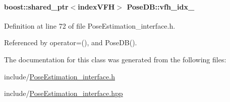\hypertarget{classPoseDB_a166e65f9bf6e0e268ae8e082e43fc242}{
\paragraph[{vfh\-\_\-idx\-\_\-}]{\setlength{\rightskip}{0pt plus 5cm}boost\-::shared\-\_\-ptr$<${\bf index\-V\-F\-H}$>$ Pose\-D\-B\-::vfh\-\_\-idx\-\_\-\hspace{0.3cm}{\ttfamily [private]}}}\label{classPoseDB_a166e65f9bf6e0e268ae8e082e43fc242}


Definition at line 72 of file Pose\-Estimation\-\_\-interface.\-h.



Referenced by operator=(), and Pose\-D\-B().



The documentation for this class was generated from the following files\-:\begin{DoxyCompactItemize}
\item 
include/\hyperlink{PoseEstimation__interface_8h}{Pose\-Estimation\-\_\-interface.\-h}\item 
include/\hyperlink{PoseEstimation__interface_8hpp}{Pose\-Estimation\-\_\-interface.\-hpp}\end{DoxyCompactItemize}
